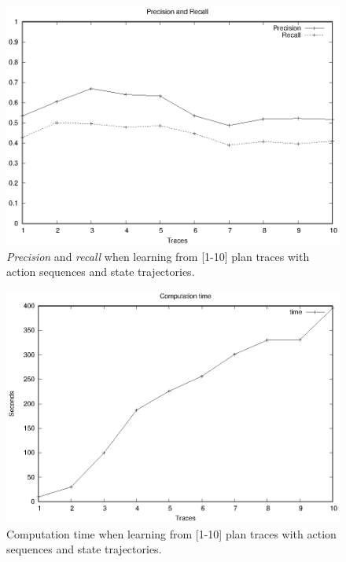 \begin{figure}[hbt!]
	\centering
	\includegraphics[width=0.7\linewidth]{figures/input_size_0_0_precision.eps}
	\caption{{\em Precision} and {\em recall} when learning from [1-10] plan traces with \NO action sequences and \NO state trajectories.}
	\label{fig:pspace_quality}
\end{figure}
\begin{figure}[hbt!]
	\centering
	\includegraphics[width=0.7\linewidth]{figures/input_size_0_0_time.eps}
	\caption{Computation time when learning from [1-10] plan traces with \NO action sequences and \NO state trajectories.}
	\label{fig:pspace_time}
\end{figure}



